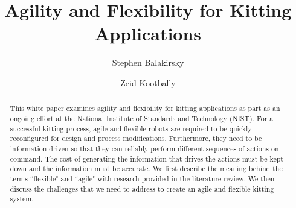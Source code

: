 \documentclass[final,3p,12pt]{elsarticle}
\begin{document}
\begin{frontmatter}



\title{Agility and Flexibility for Kitting Applications}


\author[NIST]{Stephen Balakirsky}
\author[UMD]{Zeid Kootbally}

\address[NIST]{National Institute of Standards and Technology, Gaithersburg, MD USA}
\address[UMD]{University of Maryland, College Park, MD, USA}

 \begin{abstract}
This white paper examines agility and flexibility for kitting applications as part as an ongoing effort at the National Institute of Standards and Technology (NIST). For a successful kitting process, agile and flexible robots are required to be quickly reconfigured for design and process modifications. Furthermore, they need to be information driven so that they can reliably perform different sequences of actions on command. The cost of generating the information that drives the actions must be kept down and the information must be accurate. We first describe the meaning behind the terms ``flexible" and ``agile" with research provided in the literature review. We then discuss the challenges that we need to address to create an agile and flexible kitting system.

 \end{abstract}


\end{frontmatter}
\end{document}
